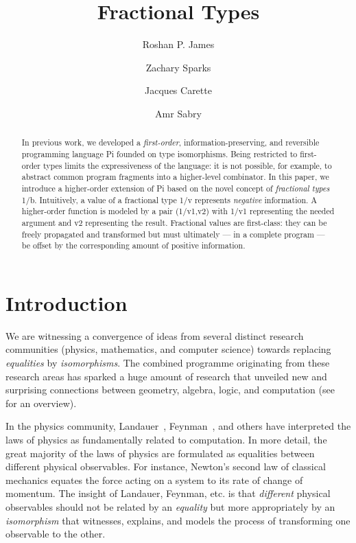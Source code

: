 \documentclass{llncs}
\begin{document}
\title{Fractional Types}
\author{Roshan P. James \and Zachary Sparks \and Jacques Carette \and Amr Sabry}
\maketitle

\begin{abstract}
  In previous work, we developed a \emph{first-order},
  information-preserving, and reversible programming language {{Pi}} founded
  on type isomorphisms. Being restricted to first-order types limits the
  expressiveness of the language: it is not possible, for example, to
  abstract common program fragments into a higher-level combinator. In this
  paper, we introduce a higher-order extension of {{Pi}} based on the novel
  concept of \emph{fractional types} {{1/b}}. Intuitively, a value of a
  fractional type {{1/v}} represents \emph{negative} information. A
  higher-order function is modeled by a pair {{(1/v1,v2)}} with {{1/v1}}
  representing the needed argument and {{v2}} representing the
  result. Fractional values are first-class: they can be freely propagated
  and transformed but must ultimately --- in a complete program --- be offset
  by the corresponding amount of positive information.
\end{abstract}

\section{Introduction} 

We are witnessing a convergence of ideas from several distinct research
communities (physics, mathematics, and computer science) towards replacing
\emph{equalities} by \emph{isomorphisms}. The combined programme originating
from these research areas has sparked a huge amount of research that unveiled
new and surprising connections between geometry, algebra, logic, and
computation (see~\cite{baez2011physics} for an overview).

In the physics community, Landauer~\cite{Landauer,Landauer:1961},
Feynman~\cite{springerlink:10.1007/BF02650179}, and others have interpreted
the laws of physics as fundamentally related to computation. In more detail,
the great majority of the laws of physics are formulated as equalities
between different physical observables. For instance, Newton's second law of
classical mechanics equates the force acting on a system to its rate of
change of momentum. The insight of Landauer, Feynman, etc. is that
\emph{different} physical observables should not be related by an
\emph{equality} but more appropriately by an \emph{isomorphism} that
witnesses, explains, and models the process of transforming one observable to
the other.
\end{document}

